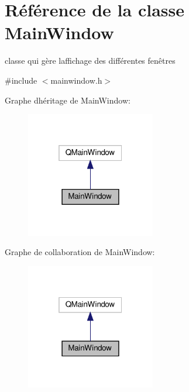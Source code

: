 \hypertarget{class_main_window}{}\section{Référence de la classe Main\+Window}
\label{class_main_window}


classe qui gère l\textquotesingle{}affichage des différentes fenêtres  




{\ttfamily \#include $<$mainwindow.\+h$>$}



Graphe d\textquotesingle{}héritage de Main\+Window\+:
\nopagebreak
\begin{figure}[H]
\begin{center}
\leavevmode
\includegraphics[width=160pt]{class_main_window__inherit__graph}
\end{center}
\end{figure}


Graphe de collaboration de Main\+Window\+:
\nopagebreak
\begin{figure}[H]
\begin{center}
\leavevmode
\includegraphics[width=160pt]{class_main_window__coll__graph}
\end{center}
\end{figure}
